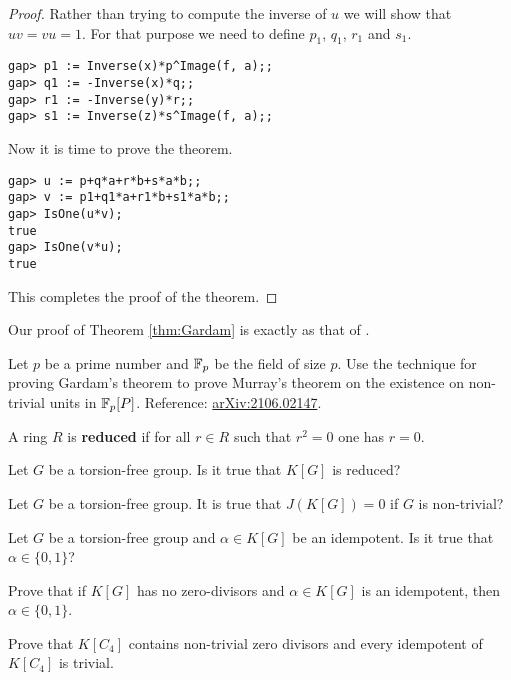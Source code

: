 \begin{proof}
    Rather than trying 
    to compute the inverse of $u$ we will show that 
    $uv=vu=1$. For that purpose we need to define
    $p_1$, $q_1$, $r_1$ and $s_1$.
\begin{lstlisting}
gap> p1 := Inverse(x)*p^Image(f, a);;
gap> q1 := -Inverse(x)*q;;
gap> r1 := -Inverse(y)*r;;
gap> s1 := Inverse(z)*s^Image(f, a);;
\end{lstlisting}
Now it is time to prove the theorem. 
\begin{lstlisting}
gap> u := p+q*a+r*b+s*a*b;;
gap> v := p1+q1*a+r1*b+s1*a*b;;
gap> IsOne(u*v);
true
gap> IsOne(v*u);
true
\end{lstlisting}
This completes the proof of the theorem. 
\end{proof}

Our proof of Theorem \ref{thm:Gardam} is exactly 
as that of \cite{MR4334981}. 

\begin{exercise}
     Let $p$ be a prime number and $\mathbb{F}_p$ be the field of size $p$. 
     Use the technique 
     for proving Gardam's theorem to prove Murray's theorem
     on the existence 
     on non-trivial units in $\mathbb{F}_p[P]$. 
     Reference: \href{https://arxiv.org/abs/2106.02147}{arXiv:2106.02147}. 
\end{exercise}

A ring $R$ is \textbf{reduced} if for all $r\in R$ such that 
$r^2=0$ one has $r=0$. 

\begin{problem}
	\label{prob:reducido}
	Let $G$ be a torsion-free group. Is it true that 
	$K[G]$ is reduced? 
\end{problem}

\begin{problem}[Semisimplicity]
	\label{prob:J}
	Let $G$ be a torsion-free group. It is true that 
	$J(K[G])=0$ if $G$ is non-trivial?
\end{problem}

\begin{problem}[Idempotents]
	\label{pro:idempotente}
	Let $G$ be a torsion-free group and $\alpha\in K[G]$ be an idempotent. 
	Is it true that $\alpha\in\{0,1\}$?
\end{problem}

\begin{exercise}
	Prove that if $K[G]$ has no zero-divisors and $\alpha\in K[G]$ is an
	idempotent, then $\alpha\in\{0,1\}$.
\end{exercise}

\begin{exercise}
	Prove that $K[C_4]$ contains non-trivial zero divisors and every
	idempotent of $K[C_4]$ is trivial. 
\end{exercise}

